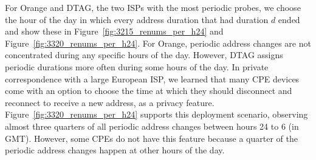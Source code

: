 For Orange and DTAG, the two ISPs with the most periodic probes, we
choose the hour of the day in which every address duration that had
duration $d$ ended and show these in Figure~\ref{fig:3215_renums_per_h24}
and Figure~\ref{fig:3320_renums_per_h24}. For Orange, periodic address
changes are not concentrated during any specific hours of
the day. However, DTAG assigns periodic
durations more often during some hours of the day. In private
correspondence with a large European ISP, we learned that many CPE devices come with an option to choose the time
at which they should disconnect and reconnect to receive a new
address, as a privacy
feature. Figure~\ref{fig:3320_renums_per_h24} supports this
deployment scenario, observing almost three quarters of all periodic
address changes between hours 24 to 6 (in GMT). However, some
CPEs do not have this feature because a quarter of the periodic
address changes happen at other hours of the day.

